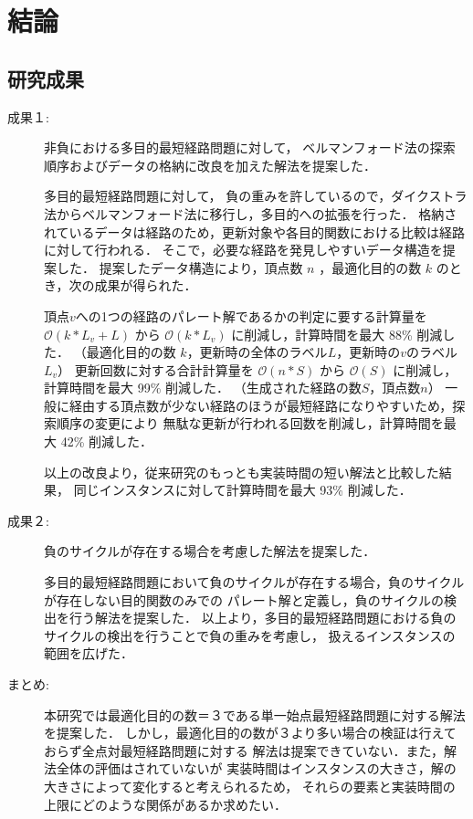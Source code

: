 \documentclass[12pt]{optlab-bachelor}
\begin{document}
\chapter{結論}

\section{研究成果}

\begin{description}
  \item[成果１:]
  非負における多目的最短経路問題に対して，
  ベルマンフォード法の探索順序およびデータの格納に改良を加えた解法を提案した．

  多目的最短経路問題に対して，
  負の重みを許しているので，ダイクストラ法からベルマンフォード法に移行し，多目的への拡張を行った．
  格納されているデータは経路のため，更新対象や各目的関数における比較は経路に対して行われる．
  そこで，必要な経路を発見しやすいデータ構造を提案した．
  提案したデータ構造により，頂点数 $n$ ，最適化目的の数 $k$ のとき，次の成果が得られた．

  頂点$v$への1つの経路のパレート解であるかの判定に要する計算量を $\mathcal{O}(k*L_v+L)$ から $\mathcal{O}(k*L_v)$
  に削減し，計算時間を最大 88\% 削減した．
  （最適化目的の数 $k$，更新時の全体のラベル$L$，更新時の$v$のラベル$L_v$）
  更新回数に対する合計計算量を $\mathcal{O}(n*S)$ から $\mathcal{O}(S)$ に削減し，計算時間を最大 99\% 削減した．
  （生成された経路の数$S$，頂点数$n$）
  一般に経由する頂点数が少ない経路のほうが最短経路になりやすいため，探索順序の変更により
  無駄な更新が行われる回数を削減し，計算時間を最大 42\% 削減した．

  以上の改良より，従来研究のもっとも実装時間の短い解法と比較した結果，
  同じインスタンスに対して計算時間を最大 93\% 削減した．
\end{description}

\begin{description}
  \item[成果２:]
  負のサイクルが存在する場合を考慮した解法を提案した．

  多目的最短経路問題において負のサイクルが存在する場合，負のサイクルが存在しない目的関数のみでの
  パレート解と定義し，負のサイクルの検出を行う解法を提案した．
  以上より，多目的最短経路問題における負のサイクルの検出を行うことで負の重みを考慮し，
  扱えるインスタンスの範囲を広げた．
\end{description}

\begin{description}
  \item[まとめ:]
  本研究では最適化目的の数＝３である単一始点最短経路問題に対する解法を提案した．
  しかし，最適化目的の数が３より多い場合の検証は行えておらず全点対最短経路問題に対する
  解法は提案できていない．また，解法全体の評価はされていないが
  実装時間はインスタンスの大きさ，解の大きさによって変化すると考えられるため，
  それらの要素と実装時間の上限にどのような関係があるか求めたい．
\end{description}
\end{document}
